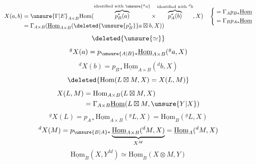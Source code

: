 \[
\begin{aligned}
X(a,b)&=\unsure{\Gamma|E}_{A\times B}\mathrm{Hom}(\overbrace{p_B^*(a)}^{\text{identified with }\unsure{{}^g a}}\times\overbrace{p_A^*(b)}^{\text{identified with }{}^d b},X)\\
&=\Gamma_{A\times B}(\underline{\mathrm{Hom}}_{A\times B}(\deleted{\unsure{p_B^*}}a\boxtimes b,X))
\end{aligned}
\quad\left\{\begin{aligned}&=\Gamma_A p_{B*}\underline{\mathrm{Hom}}\\&=\Gamma_B p_{A*}\underline{\mathrm{Hom}}\end{aligned}\right.
\]
\[
\deleted{\unsure{\simeq}}
\]
\[
{}^gX(a)=p_{\unsure{A|B}*}\underline{\mathrm{Hom}}_{A\times B}({}^ga,X)
\]
\[
{}^dX(b)=p_{B*}\underline{\mathrm{Hom}}_{A\times B}({}^db,X)
\]
\[
\deleted{\mathrm{Hom}(L\boxtimes M,X)=X(L,M)}
\]
\[
\begin{aligned}
X(L,M)&=\mathrm{Hom}_{A\times B}(L\boxtimes M,X)\\
&=\Gamma_{A\times B}\underline{\mathrm{Hom}}(L\boxtimes M,\unsure{Y|X})
\end{aligned}
\]
\[
{}^gX(L)=p_{A*}\underline{\mathrm{Hom}}_{A\times B}({}^gL,X)=\underline{\mathrm{Hom}}_B({}^gL,X)
\]
\[
{}^dX(M)=p_{\unsure{B|A}*}\underbrace{\underline{\mathrm{Hom}}_{A\times B}({}^dM,X)}_{X^M}=\underline{\mathrm{Hom}}_A({}^dM,X)
\]
\[
\underline{\mathrm{Hom}}_B(X,Y^M)\simeq\underline{\mathrm{Hom}}_B(X\otimes M,Y)
\]
